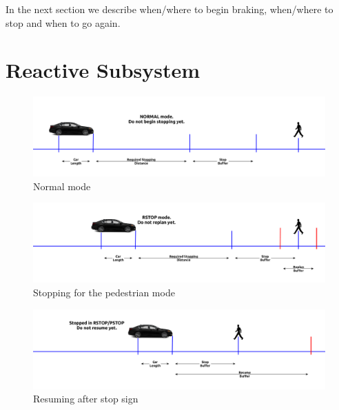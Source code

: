 \documentclass[letterpaper, 10 pt, conference]{ieeeconf}  %
\begin{document}
In the next section we describe when/where to begin braking, when/where to stop
and when to go again.

\section{Reactive Subsystem} \label{sec:reactiveubsystem}

\begin{figure}[thpb]
  \centering
  \includegraphics[width=1.0\columnwidth]{graphics/RSTOP_NORMAL.png}
  \caption{Normal mode}
  \label{fig:react1}
\end{figure}
\begin{figure}[thpb]
  \centering
  \includegraphics[width=1.0\columnwidth]{graphics/RSTOP_RSTOP.png}
  \caption{Stopping for the pedestrian mode}
  \label{fig:react2}
\end{figure}
\begin{figure}[thpb]
  \centering
  \includegraphics[width=1.0\columnwidth]{graphics/RSTOP_RESUME.png}
  \caption{Resuming after stop sign}
  \label{fig:react3}
\end{figure}
\end{document}
